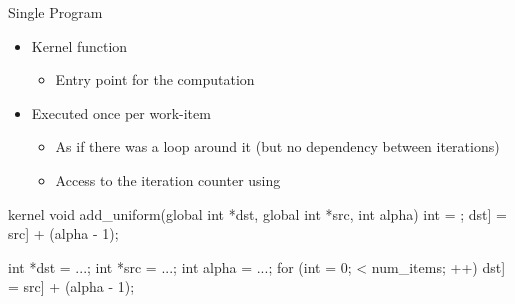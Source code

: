 \begin{frame}[fragile]{Single Program}

\begin{itemize}
    \item Kernel function
    \begin{itemize}
        \item Entry point for the computation
    \end{itemize}
    \item Executed once per work-item
    \begin{itemize}
        \item As if there was a loop around it (but no dependency between iterations)
        \item Access to the iteration counter using \texttt{}
    \end{itemize}
\end{itemize}

\vspace{1ex}
\begin{minipage}[t]{0.45\linewidth}
\begin{codebox}[commandchars=\\\[\]]
kernel void add_uniform(global int *dst,
                        global int *src,
                        int alpha) {
  int \varying[tid] = ;
  dst\idx[\varying[tid]] = src\idx[\varying[tid]] + (alpha - 1);
}
\end{codebox}

\end{minipage}\hspace{1em}\begin{minipage}[t]{0.49\linewidth}
\begin{codebox}[commandchars=\\\[\]]
int *dst = ...;
int *src = ...;
int alpha = ...;
for (int \varying[tid] = 0; \varying[tid] < num_items; \varying[tid]++) {
  dst\idx[\varying[tid]] = src\idx[\varying[tid]] + (alpha - 1);
}
\end{codebox}

\end{minipage}


\end{frame}

